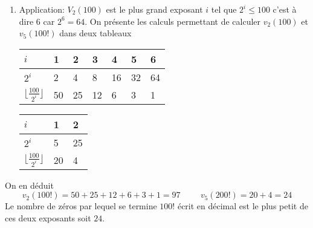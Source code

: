 \begin{enumerate}
  \item Application: $V_2(100)$ est le plus grand exposant $i$ tel que $2^i \leq 100$ c'est à dire $6$ car $2^6 =64$. On présente les calculs permettant de calculer $v_2(100)$ et $v_5(100!)$ dans deux tableaux
\begin{center} \renewcommand{\arraystretch}{1.5}
\begin{tabular}{|l|l|l|l|l|l|l|} \hline
$i$                              & 1 & 2 & 3 & 4 & 5 & 6\\ \hline
$2^i$                            & 2 & 4 & 8 & 16 & 32 & 64\\ \hline
$\lfloor \frac{100}{2^i}\rfloor$ & 50 & 25 & 12 & 6 & 3 & 1 \\ \hline
\end{tabular}
\hspace{1cm}
\begin{tabular}{|l|l|l|} \hline
$i$                              & 1 & 2 \\ \hline
$2^i$                            & 5 & 25\\ \hline
$\lfloor \frac{100}{2^i}\rfloor$ & 20 & 4 \\ \hline
\end{tabular}
\end{center}
\end{enumerate}
On en déduit
\begin{displaymath}
  v_2(100!) = 50+25+12+6+3+1 = 97\hspace{1cm} v_5(200!) = 20+4 = 24
\end{displaymath}
Le nombre de zéros par lequel se termine $100!$ écrit en décimal est le plus petit de ces deux exposants soit $24$.

